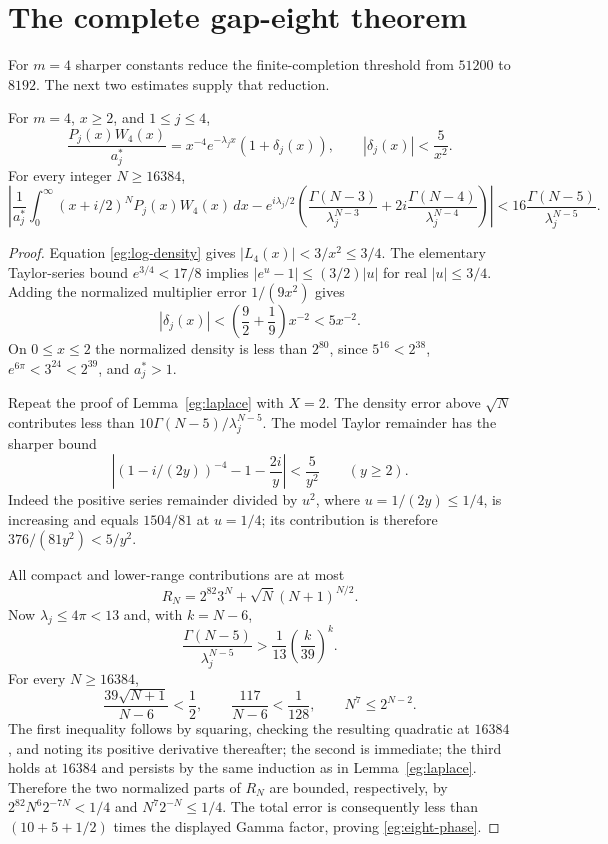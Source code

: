 \section{The complete gap-eight theorem}
\label{eg:gap-eight}

For $m=4$ sharper constants reduce the finite-completion threshold
from $51200$ to $8192$.  The next two estimates supply that reduction.

\begin{lemma}
\label{eg:eight-laplace}
For $m=4$, $x\ge2$, and $1\le j\le4$,
\[
 \frac{P_j(x)W_4(x)}{a_j^*}
    =x^{-4}e^{-\lambda_jx}(1+\delta_j(x)),\qquad
 |\delta_j(x)|<\frac5{x^2}.
\]
For every integer $N\ge16384$,
\begin{equation}\label{eg:eight-phase}
 \left|\frac1{a_j^*}\int_0^\infty(x+i/2)^NP_j(x)W_4(x)\,dx
 -e^{i\lambda_j/2}
     \left(\frac{\Gamma(N-3)}{\lambda_j^{N-3}}
            +2i\frac{\Gamma(N-4)}{\lambda_j^{N-4}}\right)\right|
       <16\frac{\Gamma(N-5)}{\lambda_j^{N-5}}.
\end{equation}
\end{lemma}

\begin{proof}
Equation \eqref{eg:log-density} gives $|L_4(x)|<3/x^2\le3/4$.
The elementary Taylor-series bound $e^{3/4}<17/8$ implies
$|e^u-1|\le(3/2)|u|$ for real $|u|\le3/4$.  Adding the
normalized multiplier error $1/(9x^2)$ gives
\[
 |\delta_j(x)|<\left(\frac92+\frac19\right)x^{-2}<5x^{-2}.
\]
On $0\le x\le2$ the normalized density is less than $2^{80}$,
since $5^{16}<2^{38}$, $e^{6\pi}<3^{24}<2^{39}$, and $a_j^*>1$.

Repeat the proof of Lemma~\ref{eg:laplace} with $X=2$.  The
density error above $\sqrt N$ contributes less than
$10\Gamma(N-5)/\lambda_j^{N-5}$.  The model Taylor remainder
has the sharper bound
\[
 \left|(1-i/(2y))^{-4}-1-\frac{2i}{y}\right|<\frac5{y^2}
       \qquad(y\ge2).
\]
Indeed the positive series remainder divided by $u^2$, where
$u=1/(2y)\le1/4$, is increasing and equals $1504/81$ at $u=1/4$;
its contribution is therefore $376/(81y^2)<5/y^2$.

All compact and lower-range contributions are at most
\[
 R_N=2^{82}3^N+\sqrt N(N+1)^{N/2}.
\]
Now $\lambda_j\le4\pi<13$ and, with $k=N-6$,
\[
 \frac{\Gamma(N-5)}{\lambda_j^{N-5}}
       >\frac1{13}\left(\frac{k}{39}\right)^k.
\]
For every $N\ge16384$,
\[
 \frac{39\sqrt{N+1}}{N-6}<\frac12,\qquad
 \frac{117}{N-6}<\frac1{128},\qquad N^7\le2^{N-2}.
\]
The first inequality follows by squaring, checking the resulting
quadratic at $16384$, and noting its positive derivative thereafter;
the second is immediate; the third holds at $16384$ and persists
by the same induction as in Lemma~\ref{eg:laplace}.  Therefore
the two normalized parts of $R_N$ are bounded, respectively, by
$2^{82}N^6 2^{-7N}<1/4$ and $N^7 2^{-N}\le1/4$.
The total error is consequently less than $(10+5+1/2)$ times the
displayed Gamma factor, proving \eqref{eg:eight-phase}.
\end{proof}

